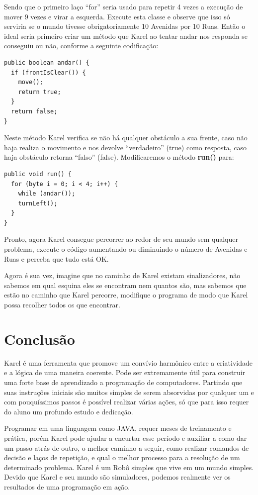 \documentclass[a4paper,11pt]{article}
\begin{document}
Sendo que o primeiro laço ``for'' seria usado para repetir 4 vezes a execução de mover 9 vezes e virar a esquerda. Execute esta classe e observe que isso só serviria se o mundo tivesse obrigatoriamente 10 Avenidas por 10 Ruas. Então o ideal seria primeiro criar um método que Karel ao tentar andar nos responda se conseguiu ou não, conforme a seguinte codificação:
\begin{lstlisting}
public boolean andar() {
  if (frontIsClear()) {
    move();
    return true;
  }
  return false;
}
\end{lstlisting}

Neste método Karel verifica se não há qualquer obstáculo a sua frente, caso não haja realiza o movimento e nos devolve ``verdadeiro'' (true) como resposta, caso haja obstáculo retorna ``falso'' (false). Modificaremos o método \textbf{run()} para:
\begin{lstlisting}
public void run() {
  for (byte i = 0; i < 4; i++) {
    while (andar());
    turnLeft();
  }
}
\end{lstlisting}

Pronto, agora Karel consegue percorrer ao redor de seu mundo sem qualquer problema, execute o código aumentando ou diminuindo o número de Avenidas e Ruas e 
perceba que tudo está OK.

Agora é sua vez, imagine que no caminho de Karel existam sinalizadores, não sabemos em qual esquina eles se encontram nem quantos são, mas sabemos que estão 
no caminho que Karel percorre, modifique o programa de modo que Karel possa recolher todos os que encontrar.

\section{Conclusão}
Karel é uma ferramenta que promove um convívio harmônico entre a criatividade e a lógica de uma maneira coerente. Pode ser extremamente útil para construir uma forte base de aprendizado a programação de computadores. Partindo que suas instruções iniciais são muitos simples de serem absorvidas por qualquer um e com pouquíssimos passos é possível realizar várias ações, só que para isso requer do aluno um profundo estudo e dedicação.

Programar em uma linguagem como JAVA, requer meses de treinamento e prática, porém Karel pode ajudar a encurtar esse período e auxiliar a como dar um passo atrás de outro, o melhor caminho a seguir, como realizar comandos de decisão e laços de repetição, e qual o melhor processo para a resolução de um determinado problema. Karel é um Robô simples que vive em um mundo simples. Devido que Karel e seu mundo são simuladores, podemos realmente ver os resultados de uma programação em ação. 
\end{document}
